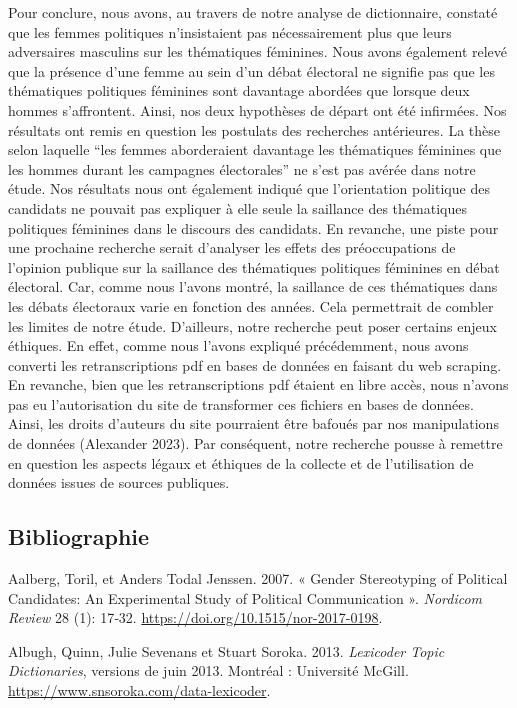 \documentclass[
  letterpaper,
  DIV=11,
  numbers=noendperiod]{scrartcl}
\begin{document}
Pour conclure, nous avons, au travers de notre analyse de dictionnaire,
constaté que les femmes politiques n'insistaient pas nécessairement plus
que leurs adversaires masculins sur les thématiques féminines. Nous
avons également relevé que la présence d'une femme au sein d'un débat
électoral ne signifie pas que les thématiques politiques féminines sont
davantage abordées que lorsque deux hommes s'affrontent. Ainsi, nos deux
hypothèses de départ ont été infirmées. Nos résultats ont remis en
question les postulats des recherches antérieures. La thèse selon
laquelle ``les femmes aborderaient davantage les thématiques féminines
que les hommes durant les campagnes électorales'' ne s'est pas avérée
dans notre étude. Nos résultats nous ont également indiqué que
l'orientation politique des candidats ne pouvait pas expliquer à elle
seule la saillance des thématiques politiques féminines dans le discours
des candidats. En revanche, une piste pour une prochaine recherche
serait d'analyser les effets des préoccupations de l'opinion publique
sur la saillance des thématiques politiques féminines en débat
électoral. Car, comme nous l'avons montré, la saillance de ces
thématiques dans les débats électoraux varie en fonction des années.
Cela permettrait de combler les limites de notre étude. D'ailleurs,
notre recherche peut poser certains enjeux éthiques. En effet, comme
nous l'avons expliqué précédemment, nous avons converti les
retranscriptions pdf en bases de données en faisant du web scraping. En
revanche, bien que les retranscriptions pdf étaient en libre accès, nous
n'avons pas eu l'autorisation du site de transformer ces fichiers en
bases de données. Ainsi, les droits d'auteurs du site pourraient être
bafoués par nos manipulations de données (Alexander 2023). Par
conséquent, notre recherche pousse à remettre en question les aspects
légaux et éthiques de la collecte et de l'utilisation de données issues
de sources publiques.

\hypertarget{bibliographie}{%
\subsection{\texorpdfstring{\textbf{Bibliographie}}{Bibliographie}}\label{bibliographie}}

Aalberg, Toril, et Anders Todal Jenssen. 2007. « Gender Stereotyping of
Political Candidates: An Experimental Study of Political Communication
». \emph{Nordicom Review} 28 (1): 17‑32.
\url{https://doi.org/10.1515/nor-2017-0198}.

Albugh, Quinn, Julie Sevenans et Stuart Soroka. 2013. \emph{Lexicoder
Topic Dictionaries}, versions de juin 2013. Montréal : Université
McGill. \url{https://www.snsoroka.com/data-lexicoder}.
\end{document}
